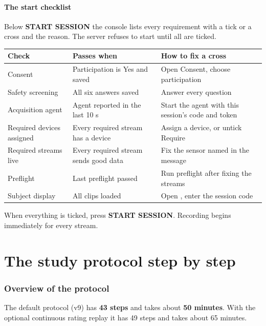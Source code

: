 \documentclass[11pt,a4paper]{article}
\newcommand{\code}[1]{\texttt{\detokenize{#1}}}
\newcommand{\ui}[1]{\textsf{\textbf{#1}}}
\begin{document}
\subsection{The start checklist}
Below \ui{START SESSION} the console lists every requirement with a tick or a cross and the reason. The server
refuses to start until all are ticked.

\begin{longtable}{@{}p{3.6cm}p{5cm}p{6cm}@{}}
\toprule
\textbf{Check} & \textbf{Passes when} & \textbf{How to fix a cross} \\
\midrule\endhead
Consent & Participation is Yes and saved & Open Consent, choose participation \\
Safety screening & All six answers saved & Answer every question \\
Acquisition agent & Agent reported in the last 10 s & Start the agent with this session's code and token \\
Required devices assigned & Every required stream has a device & Assign a device, or untick Require \\
Required streams live & Every required stream sends good data & Fix the sensor named in the message \\
Preflight & Last preflight passed & Run preflight after fixing the streams \\
Subject display & All clips loaded & Open \code{/subject}, enter the session code \\
\bottomrule
\end{longtable}

When everything is ticked, press \ui{START SESSION}. Recording begins immediately for every stream.

\part{The study protocol step by step}

\section{Overview of the protocol}

The default protocol (v9) has \textbf{43 steps} and takes about \textbf{50 minutes}. With the optional continuous
rating replay it has 49 steps and takes about 65 minutes.
\end{document}
